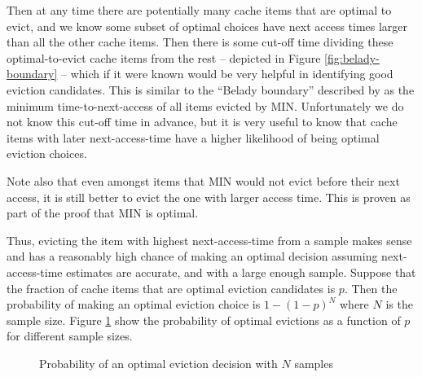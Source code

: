 Then at any time there are potentially many cache items that are optimal to evict, and we know some subset of optimal choices have next access times larger than all the other cache items. Then there is some cut-off time dividing these optimal-to-evict cache items from the rest -- depicted in Figure \ref{fig:belady-boundary} -- which if it were known would be very helpful in identifying good eviction candidates. This is similar to the ``Belady boundary'' described by \citet{relaxedBelady} as the minimum time-to-next-access of all items evicted by MIN. Unfortunately we do not know this cut-off time in advance, but it is very useful to know that cache items with later next-access-time have a higher likelihood of being optimal eviction choices. 

Note also that even amongst items that MIN would not evict before their next access, it is still better to evict the one with larger access time. This is proven as part of the proof that MIN is optimal.~\cite{MINOptimality} %

Thus, evicting the item with highest next-access-time from a sample makes sense and has a reasonably high chance of making an optimal decision assuming next-access-time estimates are accurate, and with a large enough sample. Suppose that the fraction of cache items that are optimal eviction candidates is $p$. Then the probability of making an optimal eviction choice is $1-(1-p)^N$ where $N$ is the sample size. Figure \ref{plot:P-opt-eviction} show the probability of optimal evictions as a function of $p$ for different sample sizes.

\begin{figure}
    \centering
    \caption{Probability of an optimal eviction decision with $N$ samples}
    \label{plot:P-opt-eviction}
\end{figure}



